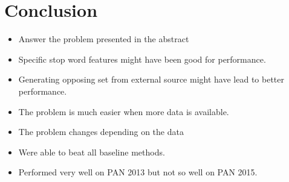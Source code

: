 \section{Conclusion} \label{sec:conclusion}

\begin{itemize}
    \item Answer the problem presented in the abstract
    \item Specific stop word features might have been good for performance.
    \item Generating opposing set from external source might have lead to better
        performance.
    \item The problem is much easier when more data is available.
    \item The problem changes depending on the data
    \item Were able to beat all baseline methods.
    \item Performed very well on PAN 2013 but not so well on PAN 2015.
\end{itemize}
